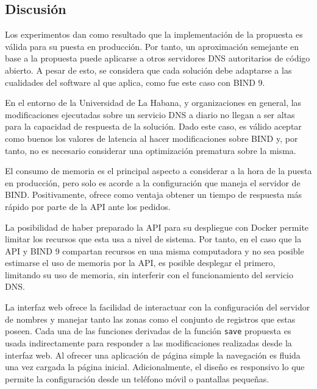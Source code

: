 \subsection{Discusión}

Los experimentos dan como resultado que la implementación de la propuesta es válida para su puesta en producción. Por tanto, un aproximación semejante en base a la propuesta puede aplicarse a otros servidores DNS autoritarios de código abierto. A pesar de esto, se considera que cada solución debe adaptarse a las cualidades del software al que aplica, como fue este caso con BIND 9.

En el entorno de la Universidad de La Habana, y organizaciones en general, las modificaciones ejecutadas sobre un servicio DNS a diario no llegan a ser altas para la capacidad de respuesta de la solución. Dado este caso, es válido aceptar como buenos los valores de latencia al hacer modificaciones sobre BIND y, por tanto, no es necesario considerar una optimización prematura sobre la misma.

El consumo de memoria es el principal aspecto a considerar a la hora de la puesta en producción, pero solo es acorde a la configuración que maneja el servidor de BIND. Positivamente, ofrece como ventaja obtener un tiempo de respuesta más rápido por parte de la API ante los pedidos.

La posibilidad de haber preparado la API para su despliegue con Docker permite limitar los recursos que esta usa a nivel de sistema. Por tanto, en el caso que la API y BIND 9 compartan recursos en una misma computadora y no sea posible estimarse el uso de memoria por la API, es posible desplegar el primero, limitando su uso de memoria, sin interferir con el funcionamiento del servicio DNS.

La interfaz web ofrece la facilidad de interactuar con la configuración del servidor de nombres y manejar tanto las zonas como el conjunto de registros que estas poseen. Cada una de las funciones derivadas de la función \verb|save| propuesta es usada indirectamente para responder a las modificaciones realizadas desde la interfaz web. Al ofrecer una aplicación de página simple la navegación es fluida una vez cargada la página inicial. Adicionalmente, el diseño es responsivo lo que permite la configuración desde un teléfono móvil o pantallas pequeñas.